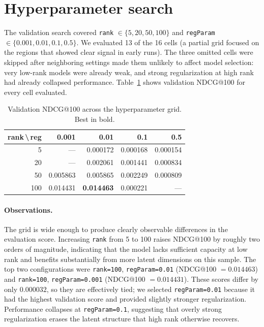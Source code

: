 \documentclass[10pt,twocolumn]{article}
\begin{document}
\section{Hyperparameter search}
The validation search covered \texttt{rank} $\in \{5, 20, 50, 100\}$ and \texttt{regParam} $\in \{0.001, 0.01, 0.1, 0.5\}$. We evaluated 13 of the 16 cells (a partial grid focused on the regions that showed clear signal in early runs). The three omitted cells were skipped after neighboring settings made them unlikely to affect model selection: very low-rank models were already weak, and strong regularization at high rank had already collapsed performance. Table~\ref{tab:sweep} shows validation NDCG@100 for every cell evaluated.

\begin{table}[t]
\centering
\caption{Validation NDCG@100 across the hyperparameter grid. Best in bold.}
\label{tab:sweep}
\footnotesize
\setlength{\tabcolsep}{3pt}
\begin{tabular}{r r r r r}
\toprule
\textbf{rank\,\textbackslash\,reg} & \textbf{0.001} & \textbf{0.01} & \textbf{0.1} & \textbf{0.5} \\
\midrule
5   & ---       & 0.000172 & 0.000168 & 0.000154 \\
20  & ---       & 0.002061 & 0.001441 & 0.000834 \\
50  & 0.005863  & 0.005865 & 0.002249 & 0.000809 \\
100 & 0.014431  & \textbf{0.014463} & 0.000221 & --- \\
\bottomrule
\end{tabular}
\end{table}

\paragraph{Observations.} The grid is wide enough to produce clearly observable differences in the evaluation score. Increasing \texttt{rank} from 5 to 100 raises NDCG@100 by roughly two orders of magnitude, indicating that the model lacks sufficient capacity at low rank and benefits substantially from more latent dimensions on this sample. The top two configurations were \texttt{rank=100}, \texttt{regParam=0.01} (NDCG@100 $=0.014463$) and \texttt{rank=100}, \texttt{regParam=0.001} (NDCG@100 $=0.014431$). These scores differ by only $0.000032$, so they are effectively tied; we selected \texttt{regParam=0.01} because it had the highest validation score and provided slightly stronger regularization. Performance collapses at \texttt{regParam=0.1}, suggesting that overly strong regularization erases the latent structure that high rank otherwise recovers.
\end{document}
